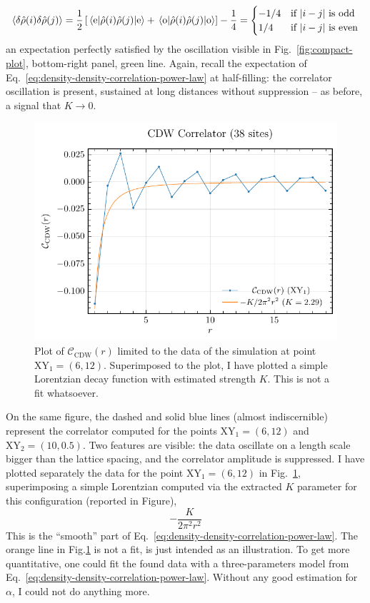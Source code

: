\[
	\ev{\delta \hat \rho(i) \delta \hat \rho(j)} = \frac{1}{2} \left[
		\mel{\mathrm{e}}{\hat \rho(i) \hat \rho(j)}{\mathrm{e}} + \mel{\mathrm{o}}{\hat \rho(i) \hat \rho(j)}{\mathrm{o}}
	\right] - \frac{1}{4} = \begin{cases}
		-1/4 &\text{if $\abs{i-j}$ is odd} \\
		1/4 &\text{if $\abs{i-j}$ is even} 
	\end{cases}
\]
an expectation perfectly satisfied by the oscillation visible in Fig.~\ref{fig:compact-plot}, bottom-right panel, green line. Again, recall the expectation of Eq.~\eqref{eq:density-density-correlation-power-law} at half-filling: the correlator oscillation is present, sustained at long distances without suppression -- as before, a signal that $K \to 0$.

\begin{figure}[t]
	\centering
	\includegraphics[width=0.6\linewidth]{../Project/analysis/states-properties/cdw-correlator_L=38.pdf}
	\caption{Plot of $\mathcal{C}_\mathrm{CDW}(r)$ limited to the data of the simulation at point $\mathrm{XY}_1 = (6,12)$. Superimposed to the plot, I have plotted a simple Lorentzian decay function with estimated strength $K$. This is not a fit whatsoever.}
	\label{fig:cdw-correlator-zoom-XY1}
\end{figure}

On the same figure, the dashed and solid blue lines (almost indiscernible) represent the correlator computed for the points $\mathrm{XY}_1=(6,12)$ and $\mathrm{XY}_2=(10,0.5)$. Two features are visible: the data oscillate on a length scale bigger than the lattice spacing, and the correlator amplitude is suppressed. I have plotted separately the data for the point $\mathrm{XY}_1 = (6,12)$ in Fig.~\ref{fig:cdw-correlator-zoom-XY1}, superimposing a simple Lorentzian computed via the extracted $K$ parameter for this configuration (reported in Figure),
\[
	- \frac{K}{2\pi^2 r^2}
\]
This is the ``smooth'' part of Eq.~\eqref{eq:density-density-correlation-power-law}. The orange line in Fig.\ref{fig:cdw-correlator-zoom-XY1} is not a fit, is just intended as an illustration. To get more quantitative, one could fit the found data with a three-parameters model from Eq.~\eqref{eq:density-density-correlation-power-law}. Without any good estimation for $\alpha$, I could not do anything more.

